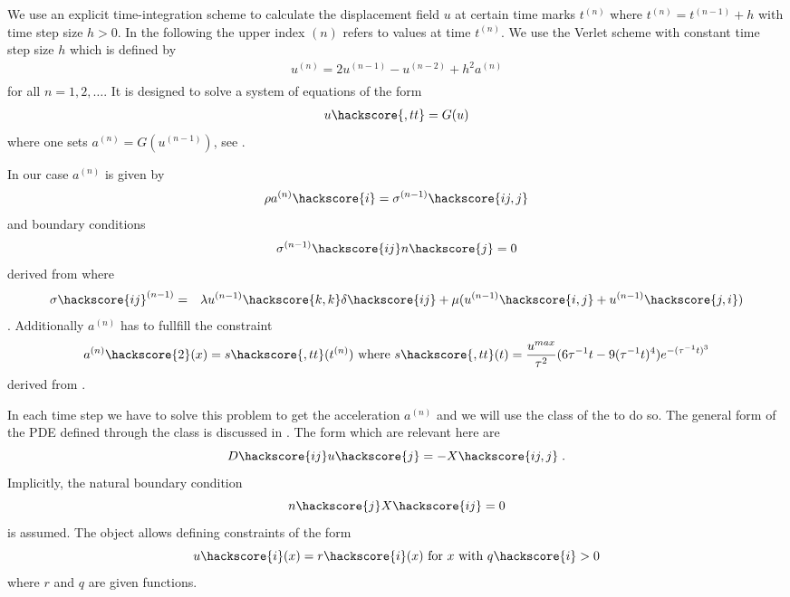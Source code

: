 We use an explicit time-integration scheme to calculate the displacement field $u$ at 
certain time marks $t^{(n)}$ where $t^{(n)}=t^{(n-1)}+h$ with time step size $h>0$. In the following the upper index ${(n)}$ refers to values at time $t^{(n)}$. We use the Verlet scheme  with constant time step size $h$
which is defined by
\begin{eqnarray} \label{WAVE dyn 2}
u^{(n)}=2u^{(n-1)}-u^{(n-2)} + h^2 a^{(n)} \\
\end{eqnarray}
for all $n=1,2,\ldots$. It is designed to solve a system of equations of the form
\begin{eqnarray} \label{WAVE dyn 2b} 
u\hackscore{,tt}=G(u)
\end{eqnarray}
where one sets $a^{(n)}=G(u^{(n-1)})$, see . 

In our case $a^{(n)}$ is given by
\begin{eqnarray}\label{WAVE dyn 3}
\rho a^{(n)}\hackscore{i}=\sigma^{(n-1)}\hackscore{ij,j}
\end{eqnarray}
and boundary conditions
\begin{eqnarray} \label{WAVE natural}
\sigma^{(n-1)}\hackscore{ij}n\hackscore{j}=0
\end{eqnarray}
derived from  where 
\begin{eqnarray} \label{WAVE dyn 3a}
\sigma\hackscore{ij}^{(n-1)} & = & \lambda u^{(n-1)}\hackscore{k,k} \delta\hackscore{ij} + \mu ( u^{(n-1)}\hackscore{i,j} + u^{(n-1)}\hackscore{j,i})
\end{eqnarray}.
Additionally $a^{(n)}$ has to fullfill the constraint
\begin{eqnarray}\label{WAVE dyn 4}
a^{(n)}\hackscore{2}(x)= s\hackscore{,tt}(t^{(n)})\mbox{ where } s\hackscore{,tt}(t)=\frac{u^{max}}{\tau^2}
(6\tau^{-1}t- 9(\tau^{-1}t)^4) e^{-(\tau^{-1}t)^3}  
\end{eqnarray}
derived from . 


In each time step we have to solve this problem to get the acceleration $a^{(n)}$ and we will
use the \LinearPDE class of the \linearPDEs to do so. The general form of the PDE defined through
the \LinearPDE class is discussed in . The form which are relevant here are  
\begin{equation}\label{WAVE dyn 100}
D\hackscore{ij} u\hackscore{j} = - X\hackscore{ij,j}\; .
\end{equation}
Implicitly, the natural boundary condition
\begin{equation}\label{WAVE dyn 101}
n\hackscore{j}X\hackscore{ij} =0 
\end{equation}
is assumed. The \LinearPDE object allows defining constraints of the form
\begin{equation}\label{WAVE dyn 101}
u\hackscore{i}(x)=r\hackscore{i}(x) \mbox{ for } x \mbox{ with } q\hackscore{i}>0
\end{equation}
where $r$ and $q$ are given functions.

